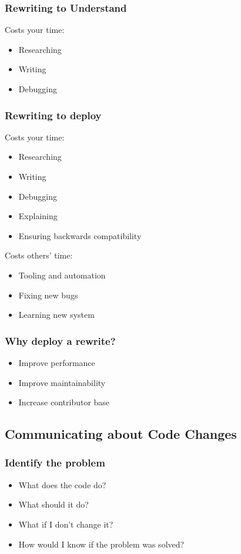 \documentclass{beamer}
\begin{document}
\begin{frame}[fragile]
\frametitle{Rewriting to Understand}
Costs your time:
\begin{itemize}[<+(1)->]
\item Researching
\item Writing
\item Debugging
\end{itemize}
\end{frame}

\begin{frame}[fragile]
\frametitle{Rewriting to deploy}
Costs your time:
\begin{itemize}[<+(1)->]
\item Researching
\item Writing
\item Debugging
\item Explaining
\item Ensuring backwards compatibility
\end{itemize}
Costs others' time:
\begin{itemize}[<+(1)->]
\item Tooling and automation
\item Fixing new bugs
\item Learning new system
\end{itemize}
\end{frame}

\begin{frame}[fragile]
\frametitle{Why deploy a rewrite?}
\begin{itemize}[<+(1)->]
\item Improve performance
\item Improve maintainability
\item Increase contributor base
\end{itemize}
\end{frame}
\subsection{Communicating about Code Changes}

\begin{frame}[fragile]
\tableofcontents[currentsubsection]
\end{frame}


\begin{frame}[fragile]
\frametitle{Identify the problem}
\begin{itemize}[<+(1)->]
\item What does the code do?
\item What should it do?
\item What if I don't change it?
\item How would I know if the problem was solved?
\end{itemize}
\end{frame}
\end{document}
